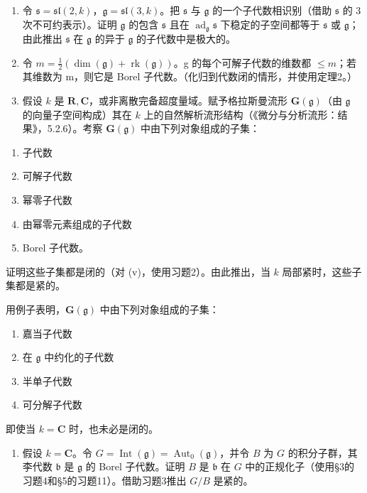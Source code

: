 
\begin{enumerate}
\def\labelenumi{\arabic{enumi})}
\item
  令 \(\mathfrak{s} = \mathfrak{sl}(2, k)\)，\(\mathfrak{g} = \mathfrak{sl}(3, k)\)。把 \(\mathfrak{s}\) 与 \(\mathfrak{g}\) 的一个子代数相识别（借助 \(\mathfrak{s}\) 的 3 次不可约表示）。证明 \(\mathfrak{g}\) 的包含 \(\mathfrak{s}\) 且在 \(\operatorname{ad}_{\mathfrak{g}}\mathfrak{s}\) 下稳定的子空间都等于 \(\mathfrak{s}\) 或 \(\mathfrak{g}\)；由此推出 \(\mathfrak{s}\) 在 \(\mathfrak{g}\) 的异于 \(\mathfrak{g}\) 的子代数中是极大的。
\item
  令 \(m = \frac{1}{2}(\dim(\mathfrak{g}) + \operatorname{rk}(\mathfrak{g}))\)。g 的每个可解子代数的维数都 \(\leq m\)；若其维数为 m，则它是 Borel 子代数。（化归到代数闭的情形，并使用定理2。）
\item
  假设 \(k\) 是 \(\mathbf{R}, \mathbf{C}\)，或非离散完备超度量域。赋予格拉斯曼流形 \(\mathbf{G}(\mathfrak{g})\)（由 \(\mathfrak{g}\) 的向量子空间构成）其在 \(k\) 上的自然解析流形结构（《微分与分析流形：结果》，5.2.6）。考察 \(\mathbf{G}(\mathfrak{g})\) 中由下列对象组成的子集：
\end{enumerate}

\begin{enumerate}
\def\labelenumi{(\roman{enumi})}
\item
  子代数
\item
  可解子代数
\item
  幂零子代数
\item
  由幂零元素组成的子代数
\item
  Borel 子代数。
\end{enumerate}

证明这些子集都是闭的（对 (v)，使用习题2）。由此推出，当 \(k\) 局部紧时，这些子集都是紧的。

用例子表明，\(\mathbf{G}(\mathfrak{g})\) 中由下列对象组成的子集：

\begin{enumerate}
\def\labelenumi{(\roman{enumi})}
\setcounter{enumi}{5}
\item
  嘉当子代数
\item
  在 \(\mathfrak{g}\) 中约化的子代数
\item
  半单子代数
\item
  可分解子代数
\end{enumerate}

即使当 \(k = \mathbf{C}\) 时，也未必是闭的。

\begin{enumerate}
\def\labelenumi{\arabic{enumi})}
\setcounter{enumi}{3}
\tightlist
\item
  假设 \(k = \mathbf{C}\)。令 \(G = \operatorname{Int}(\mathfrak{g}) = \operatorname{Aut}_0(\mathfrak{g})\)，并令 \(B\) 为 \(G\) 的积分子群，其李代数 \(\mathfrak{b}\) 是 \(\mathfrak{g}\) 的 Borel 子代数。证明 \(B\) 是 \(\mathfrak{b}\) 在 \(G\) 中的正规化子（使用§3的习题4和§5的习题11）。借助习题3推出 \(G / B\) 是紧的。
\end{enumerate}

